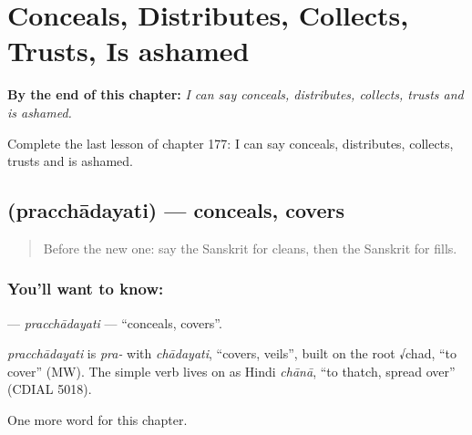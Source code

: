 
\chapter{Conceals, Distributes, Collects, Trusts, Is ashamed}
\label{ch:sa-conceals-distributes-collects-trusts-is-ashamed}

\begin{chapteropening}
\textbf{By the end of this chapter:} \emph{I can say conceals, distributes, collects, trusts and is ashamed.}

Complete the last lesson of chapter 177: I can say conceals, distributes, collects, trusts and is ashamed.
\end{chapteropening}

\section[\texorpdfstring{\sk{प्रच्छादयति} (pracchādayati)}{प्रच्छादयति (pracchādayati)}]{ (pracchādayati) — conceals, covers}

\label{lesson:SA-C177-pracchadayati}



\begin{quote}
Before the new one: say the Sanskrit for cleans, then the Sanskrit for fills.
\end{quote}

\subsection*{You'll want to know: }
\textbf{} — \emph{pracchādayati} — \textquotedblleft{}conceals, covers\textquotedblright{}.

\begin{cousinweb}
\emph{pracchādayati} is \emph{pra-} with \emph{chādayati}, \textquotedblleft{}covers, veils\textquotedblright{}, built on the root √chad, \textquotedblleft{}to cover\textquotedblright{} (MW). The simple verb lives on as Hindi \emph{chānā}, \textquotedblleft{}to thatch, spread over\textquotedblright{} (CDIAL 5018).
\end{cousinweb}

\begin{grammarlens}[title={What you've built}]
One more word for this chapter.
\end{grammarlens}

